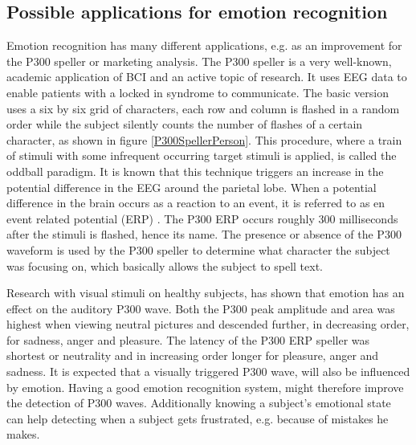 
\subsection{Possible applications for emotion recognition}
Emotion recognition has many different applications, e.g. as an improvement for the P300 speller or marketing analysis. The P300 speller is a very well-known, academic application of BCI and an active topic of research. It uses EEG data to enable patients with a locked in syndrome to communicate\cite{P300Origin}. The basic version uses a six by six grid of characters, each row and column is flashed in a random order while the subject silently counts the number of flashes of a certain character, as shown in figure \ref{P300SpellerPerson}. This procedure, where a train of stimuli with some infrequent occurring target stimuli is applied, is called the oddball paradigm\cite{PaperThibault}. It is known that this technique triggers an increase in the potential difference in the EEG around the parietal lobe. When a potential difference in the brain occurs as a reaction to an event, it is referred to as en event related potential (ERP) . The P300 ERP occurs roughly 300 milliseconds after the stimuli is flashed, hence its name\citep{ComparisonClassifications}. The presence or absence of the P300 waveform is used by the P300 speller to determine what character the subject was focusing on, which basically allows the subject to spell text. 


Research with visual stimuli on healthy subjects, has shown that emotion has an effect on the auditory P300 wave\cite{AuditoryP300Effect}. Both the P300 peak amplitude and area was highest when viewing neutral pictures and descended further, in decreasing order, for sadness, anger and pleasure. The latency of the P300 ERP speller was shortest or neutrality and in increasing order longer for pleasure, anger and sadness. It is expected that a visually triggered P300 wave, will also be influenced by emotion. Having a good emotion recognition system, might therefore improve the detection of P300 waves. Additionally knowing a subject's emotional state can help detecting when a subject gets frustrated, e.g. because of mistakes he makes.

